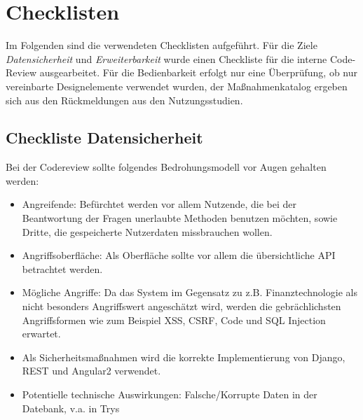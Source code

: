 \documentclass[accentcolor=tud0b,12pt,paper=a4]{tudreport}
\begin{document}
\section{Checklisten}

Im Folgenden sind die verwendeten Checklisten aufgeführt. Für die Ziele \emph{Datensicherheit} und \emph{Erweiterbarkeit} wurde einen Checkliste für die interne Code-Review ausgearbeitet. Für die Bedienbarkeit erfolgt nur eine Überprüfung, ob nur vereinbarte Designelemente verwendet wurden, der Maßnahmenkatalog ergeben sich aus den Rückmeldungen aus den Nutzungsstudien.

\subsection{Checkliste Datensicherheit}
Bei der Codereview sollte folgendes Bedrohungsmodell vor Augen gehalten werden:
\begin{multicols}{2}
\begin{itemize}
    \item Angreifende: Befürchtet werden vor allem Nutzende, die bei der Beantwortung der Fragen unerlaubte Methoden benutzen möchten, sowie Dritte, die gespeicherte Nutzerdaten missbrauchen wollen.
    \item Angriffsoberfläche: Als Oberfläche sollte vor allem die übersichtliche API betrachtet werden.
    \item Mögliche Angriffe: Da das System im Gegensatz zu z.B. Finanztechnologie als nicht besonders Angriffswert angeschätzt wird, werden die gebrächlichsten Angriffsformen wie zum Beispiel XSS, CSRF, Code und SQL Injection erwartet.
    \item Als Sicherheitsmaßnahmen wird die korrekte Implementierung von Django, REST und Angular2 verwendet.
    \item Potentielle technische Auswirkungen: Falsche/Korrupte Daten in der Datebank, v.a. in Trys
\end{itemize}
\end{multicols}
\end{document}
